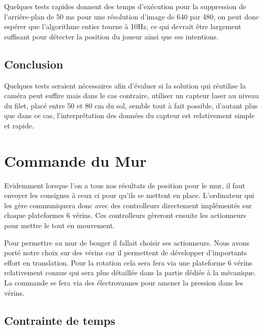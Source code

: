 Quelques tests rapides donnent des temps d'exécution pour la suppression de l'arrière-plan de 50 ms pour une résolution d'image de 640 par 480, on peut donc espérer que l'algorithme entier tourne à 10Hz, ce qui devrait être largement suffisant pour détecter la position du joueur ainsi que ses intentions. 


\section{Conclusion}

Quelques tests seraient nécessaires afin d'évaluer si la solution qui réutilise la caméra peut suffire mais dans le cas contraire, utiliser un capteur laser au niveau du filet, placé entre 50 et 80 cm du sol, semble tout à fait possible, d'autant plus que dans ce cas, l'interprétation des données du capteur est relativement simple et rapide. 




















\chapter{Commande du Mur}

Evidemment lorsque l'on a tous nos résultats de position pour le mur, il faut envoyer les consignes à ceux ci pour qu'ils se mettent en place. L'ordinateur qui les gère communiquera donc avec des controlleurs directement implémentés sur chaque plateformes 6 vérins. Ces controlleurs gèreront ensuite les actionneurs pour mettre le tout en mouvement. 

Pour permettre au mur de bouger il fallait choisir ses actionneurs. Nous avons porté notre choix sur des vérins car il permettent de développer d'importants effort en translation. Pour la rotation cela sera fera via une plateforme 6 vérins relativement connue qui sera plus détaillée dans la partie dédiée à la mécanique. La commande se fera via des électrovannes pour amener la pression dans les vérins.

\section{Contrainte de temps}

